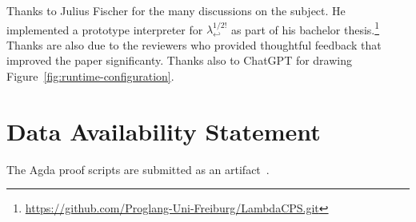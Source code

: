 \documentclass[sigplan,dvipsnames,screen]{acmart}
\newcommand{\LamOurs}{\ensuremath{\lambda^{1/2!}_{\hookleftarrow}}}
\begin{document}
\begin{acks}
  Thanks to Julius Fischer for the many discussions on the subject. He
  implemented a prototype interpreter for $\LamOurs$ as part of his
  bachelor
  thesis.\footnote{\url{https://github.com/Proglang-Uni-Freiburg/LambdaCPS.git}}
  Thanks are also due to the reviewers who provided thoughtful
  feedback that improved the paper significanty.
  Thanks also to ChatGPT for drawing Figure~\ref{fig:runtime-configuration}.
\end{acks}

\section*{Data Availability Statement}

The Agda proof scripts are submitted as an artifact~\cite{thiemann25:_artif_what_i_alway_wanted}.




\end{document}
